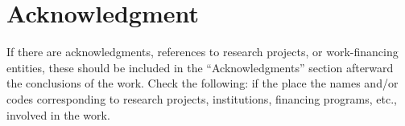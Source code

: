 \section{Acknowledgment}

If there are acknowledgments, references to research projects, or work-financing entities, these should be included in the ``Acknowledgments'' section afterward the conclusions of the work. Check the following: if the place the names and/or codes corresponding to research projects, institutions, financing programs, etc., involved in the work.